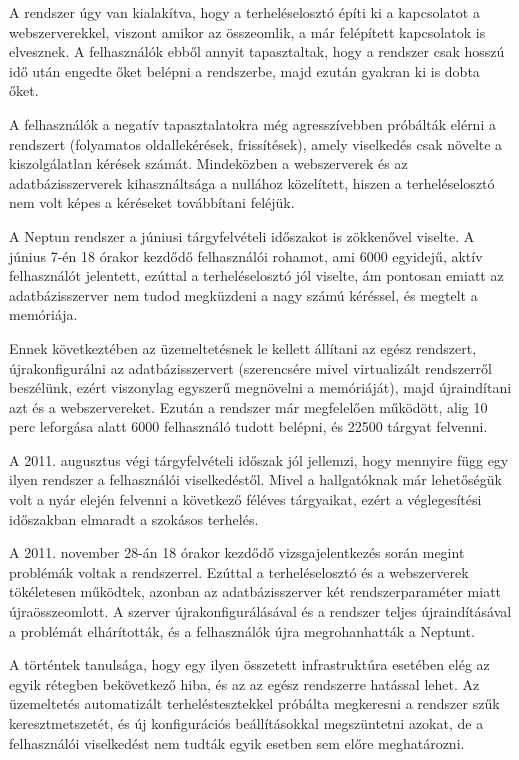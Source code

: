 A rendszer úgy van kialakítva, hogy a terheléselosztó építi ki a kapcsolatot a webszerverekkel, viszont amikor az összeomlik, a már felépített kapcsolatok is elvesznek. A felhasználók ebből annyit tapasztaltak, hogy a rendszer csak hosszú idő után engedte őket belépni a rendszerbe, majd ezután gyakran ki is dobta őket.

A felhasználók a negatív tapasztalatokra még agresszívebben próbálták elérni a rendszert (folyamatos oldallekérések, frissítések), amely viselkedés csak növelte a kiszolgálatlan kérések számát. Mindeközben a webszerverek és az adatbázisszerverek kihasználtsága a nullához közelített, hiszen a terheléselosztó nem volt képes a kéréseket továbbítani feléjük.

A Neptun rendszer a júniusi tárgyfelvételi időszakot is zökkenővel viselte. A június 7-én 18 órakor kezdődő felhasználói rohamot, ami 6000 egyidejű, aktív felhasználót jelentett, ezúttal a terheléselosztó jól viselte, ám pontosan emiatt az adatbázisszerver nem tudod megküzdeni a nagy számú kéréssel, és megtelt a memóriája.

Ennek következtében az üzemeltetésnek le kellett állítani az egész rendszert, újrakonfigurálni az adatbázisszervert (szerencsére mivel virtualizált rendszerről beszélünk, ezért viszonylag egyszerű megnövelni a memóriáját), majd újraindítani azt és a webszervereket. Ezután a rendszer már megfelelően működött, alig 10 perc leforgása alatt 6000 felhasználó tudott belépni, és 22500 tárgyat felvenni.

A 2011. augusztus végi tárgyfelvételi időszak jól jellemzi, hogy mennyire függ egy ilyen rendszer a felhasználói viselkedéstől.  Mivel a hallgatóknak már lehetőségük volt a nyár elején felvenni a következő féléves tárgyaikat, ezért a véglegesítési időszakban elmaradt a szokásos terhelés.

A 2011. november 28-án 18 órakor kezdődő vizsgajelentkezés során megint problémák voltak a rendszerrel. Ezúttal a terheléselosztó és a webszerverek tökéletesen működtek, azonban az adatbázisszerver két rendszerparaméter miatt újraösszeomlott. A szerver újrakonfigurálásával és a rendszer teljes újraindításával a problémát elhárították, és a felhasználók újra megrohanhatták a Neptunt.

A történtek tanulsága, hogy egy ilyen összetett infrastruktúra esetében elég az egyik rétegben bekövetkező hiba, és az az egész rendszerre hatással lehet. Az üzemeltetés automatizált terheléstesztekkel próbálta megkeresni a rendszer szűk keresztmetszetét, és új konfigurációs beállításokkal megszüntetni azokat, de a felhasználói viselkedést nem tudták egyik esetben sem előre meghatározni.


